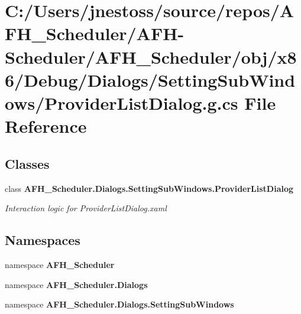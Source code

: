 \section{C\+:/\+Users/jnestoss/source/repos/\+A\+F\+H\+\_\+\+Scheduler/\+A\+F\+H-\/\+Scheduler/\+A\+F\+H\+\_\+\+Scheduler/obj/x86/\+Debug/\+Dialogs/\+Setting\+Sub\+Windows/\+Provider\+List\+Dialog.g.\+cs File Reference}
\label{x86_2_debug_2_dialogs_2_setting_sub_windows_2_provider_list_dialog_8g_8cs}
\subsection*{Classes}
\begin{DoxyCompactItemize}
\item 
class \textbf{ A\+F\+H\+\_\+\+Scheduler.\+Dialogs.\+Setting\+Sub\+Windows.\+Provider\+List\+Dialog}
\begin{DoxyCompactList}\small\item\em Interaction logic for Provider\+List\+Dialog.\+xaml \end{DoxyCompactList}\end{DoxyCompactItemize}
\subsection*{Namespaces}
\begin{DoxyCompactItemize}
\item 
namespace \textbf{ A\+F\+H\+\_\+\+Scheduler}
\item 
namespace \textbf{ A\+F\+H\+\_\+\+Scheduler.\+Dialogs}
\item 
namespace \textbf{ A\+F\+H\+\_\+\+Scheduler.\+Dialogs.\+Setting\+Sub\+Windows}
\end{DoxyCompactItemize}
